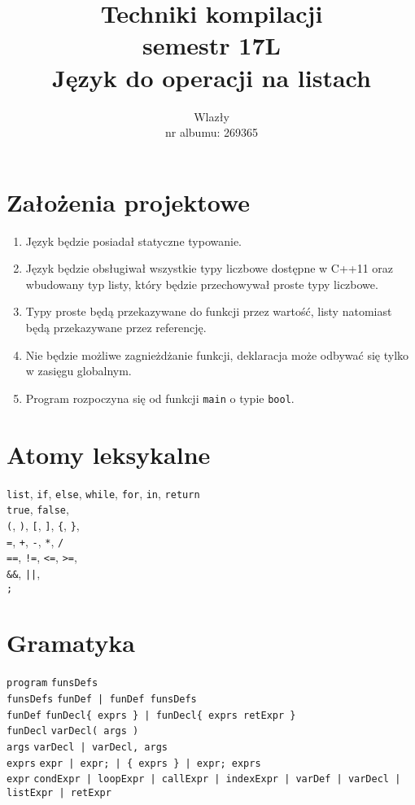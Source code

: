 \documentclass{article}
\title{\vspace{7cm}\LARGE Techniki kompilacji\\semestr 17L\\Język do operacji na listach}
\author{\LargeŁukasz Wlazły\\nr albumu: 269365}
\date{}
\newcommand{\keyword}[1]{\colorbox{light-gray}{\texttt{#1}}}
\newcommand{\code}[1]{\texttt{#1}}
\begin{document}
\maketitle
{}
\newpage
{}

\section{Założenia projektowe}
\begin{enumerate}
\item Język będzie posiadał statyczne typowanie.
\item Język będzie obsługiwał wszystkie typy liczbowe dostępne w C++11 oraz wbudowany typ listy, który będzie przechowywał proste typy liczbowe.
\item Typy proste będą przekazywane do funkcji przez wartość, listy natomiast będą przekazywane przez referencję.
\item Nie będzie możliwe zagnieżdżanie funkcji, deklaracja może odbywać się tylko w zasięgu globalnym.
\item Program rozpoczyna się od funkcji \code{main} o typie \code{bool}.
\end{enumerate}

\section{Atomy leksykalne}
\keyword{list}, \keyword{if}, \keyword{else}, \keyword{while}, \keyword{for}, \keyword{in}, \keyword{return}\\
\keyword{true}, \keyword{false}, \\
\keyword{(}, \keyword{)}, \keyword{[}, \keyword{]}, \keyword{\{}, \keyword{\}}, \\
\keyword{=}, \keyword{+}, \keyword{-}, \keyword{*}, \keyword{/} \\
\keyword{==}, \keyword{!=}, \keyword{<=}, \keyword{>=}, \\
\keyword{\&\&}, \keyword{||}, \\
\keyword{;}
\newpage
\section{Gramatyka}
\code{program} \textrightarrow \code{funsDefs} \\
\code{funsDefs} \textrightarrow \code{funDef | funDef funsDefs} \\
\code{funDef} \textrightarrow \code{funDecl\{ exprs \} | funDecl\{ exprs retExpr \}} \\
\code{funDecl} \textrightarrow \code{varDecl( args )} \\
\code{args} \textrightarrow \code{varDecl | varDecl, args} \\
\code{exprs} \textrightarrow \code{expr | expr\keyword{;} | \keyword{\{} exprs \keyword{\}} | expr\keyword{;} exprs} \\
\code{expr} \textrightarrow \code{condExpr | loopExpr | callExpr | indexExpr | varDef | varDecl | listExpr | retExpr} \\
\end{document}
